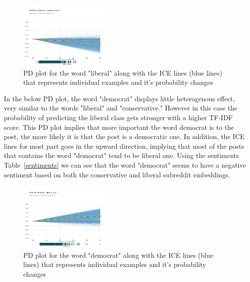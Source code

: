 \documentclass[conference]{IEEEtran}
\begin{document}
\begin{figure}[tb]
    \centering
    \includegraphics[width=0.4\textwidth]{liberal_pdp.pdf}
    \vspace{-2mm}
    \caption{PD plot for the word "liberal" along with the ICE lines (blue lines) that represents individual examples and it's probability changes}
    \label{fig:liberal_pdp}
    \vspace{-5mm}
\end{figure}

In the below PD plot, the word "democrat" displays little heterogenous effect, very similar to the words "liberal" and "conservative." However in this case the probability of predicting the liberal class gets stronger with a higher TF-IDF score. This PD plot implies that more important the word democrat is to the post, the more likely it is that the post is a democratic one. In addition, the ICE lines for most part goes in the upward direction, implying that most of the posts that contains the word "democrat" tend to be liberal one. Using the sentiments Table~\ref{sentiments} we can see that the word "democrat" seems to have a negative sentiment based on both the conservative and liberal subreddit embeddings.

\begin{figure}[tb]
    \centering
    \includegraphics[width=0.4\textwidth]{democrat_pdp.pdf}
    \vspace{-2mm}
    \caption{PD plot for the word "democrat" along with the ICE lines (blue lines) that represents individual examples and it's probability changes}
    \label{fig:democrat_pdp}
    \vspace{-5mm}
\end{figure}
\end{document}
